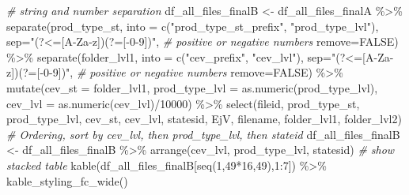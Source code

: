 \documentclass[
]{book}
\newenvironment{Shaded}{\begin{snugshade}}{\end{snugshade}}
\newcommand{\AttributeTok}[1]{\textcolor[rgb]{0.77,0.63,0.00}{#1}}
\newcommand{\CommentTok}[1]{\textcolor[rgb]{0.56,0.35,0.01}{\textit{#1}}}
\newcommand{\ConstantTok}[1]{\textcolor[rgb]{0.00,0.00,0.00}{#1}}
\newcommand{\DecValTok}[1]{\textcolor[rgb]{0.00,0.00,0.81}{#1}}
\newcommand{\FunctionTok}[1]{\textcolor[rgb]{0.00,0.00,0.00}{#1}}
\newcommand{\NormalTok}[1]{#1}
\newcommand{\OtherTok}[1]{\textcolor[rgb]{0.56,0.35,0.01}{#1}}
\newcommand{\SpecialCharTok}[1]{\textcolor[rgb]{0.00,0.00,0.00}{#1}}
\newcommand{\StringTok}[1]{\textcolor[rgb]{0.31,0.60,0.02}{#1}}
\begin{document}
\begin{Shaded}
\begin{Highlighting}[]
\CommentTok{\# string and number separation}
\NormalTok{df\_all\_files\_finalB }\OtherTok{\textless{}{-}}\NormalTok{ df\_all\_files\_finalA }\SpecialCharTok{\%\textgreater{}\%}
  \FunctionTok{separate}\NormalTok{(prod\_type\_st,}
           \AttributeTok{into =} \FunctionTok{c}\NormalTok{(}\StringTok{"prod\_type\_st\_prefix"}\NormalTok{, }\StringTok{"prod\_type\_lvl"}\NormalTok{),}
           \AttributeTok{sep=}\StringTok{"(?\textless{}=[A{-}Za{-}z])(?=[{-}0{-}9])"}\NormalTok{, }\CommentTok{\# positive or negative numbers}
           \AttributeTok{remove=}\ConstantTok{FALSE}\NormalTok{) }\SpecialCharTok{\%\textgreater{}\%}
  \FunctionTok{separate}\NormalTok{(folder\_lvl1,}
           \AttributeTok{into =} \FunctionTok{c}\NormalTok{(}\StringTok{"cev\_prefix"}\NormalTok{, }\StringTok{"cev\_lvl"}\NormalTok{),}
           \AttributeTok{sep=}\StringTok{"(?\textless{}=[A{-}Za{-}z])(?=[{-}0{-}9])"}\NormalTok{, }\CommentTok{\# positive or negative numbers}
           \AttributeTok{remove=}\ConstantTok{FALSE}\NormalTok{) }\SpecialCharTok{\%\textgreater{}\%}
  \FunctionTok{mutate}\NormalTok{(}\AttributeTok{cev\_st =}\NormalTok{ folder\_lvl1,}
         \AttributeTok{prod\_type\_lvl =} \FunctionTok{as.numeric}\NormalTok{(prod\_type\_lvl),}
         \AttributeTok{cev\_lvl =} \FunctionTok{as.numeric}\NormalTok{(cev\_lvl)}\SpecialCharTok{/}\DecValTok{10000}\NormalTok{) }\SpecialCharTok{\%\textgreater{}\%}
  \FunctionTok{select}\NormalTok{(fileid,}
\NormalTok{         prod\_type\_st, prod\_type\_lvl,}
\NormalTok{         cev\_st, cev\_lvl,}
\NormalTok{         statesid, EjV,}
\NormalTok{         filename, folder\_lvl1, folder\_lvl2)}
\CommentTok{\# Ordering, sort by cev\_lvl, then prod\_type\_lvl, then stateid}
\NormalTok{df\_all\_files\_finalB }\OtherTok{\textless{}{-}}\NormalTok{ df\_all\_files\_finalB }\SpecialCharTok{\%\textgreater{}\%}
  \FunctionTok{arrange}\NormalTok{(cev\_lvl, prod\_type\_lvl, statesid)}
\CommentTok{\# show stacked table}
\FunctionTok{kable}\NormalTok{(df\_all\_files\_finalB[}\FunctionTok{seq}\NormalTok{(}\DecValTok{1}\NormalTok{,}\DecValTok{49}\SpecialCharTok{*}\DecValTok{16}\NormalTok{,}\DecValTok{49}\NormalTok{),}\DecValTok{1}\SpecialCharTok{:}\DecValTok{7}\NormalTok{]) }\SpecialCharTok{\%\textgreater{}\%} \FunctionTok{kable\_styling\_fc\_wide}\NormalTok{()}
\end{Highlighting}
\end{Shaded}
\end{document}
